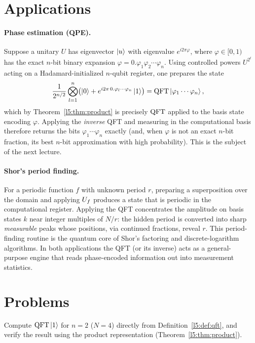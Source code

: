 \section{Applications}

\paragraph{Phase estimation (QPE).}
Suppose a unitary $U$ has eigenvector $\ket{u}$ with eigenvalue
$e^{i 2\pi\varphi}$, where $\varphi\in[0,1)$ has the exact $n$-bit binary
expansion $\varphi = 0.\varphi_1\varphi_2\cdots\varphi_n$. Using controlled
powers $U^{2^{t}}$ acting on a Hadamard-initialized $n$-qubit register, one
prepares the state
\[
  \frac{1}{2^{n/2}}\bigotimes_{l=1}^{n}
    \bigl(\ket{0}+e^{i2\pi\,0.\varphi_l\cdots\varphi_n}\ket{1}\bigr)
  = \mathrm{QFT}\ket{\varphi_1\cdots\varphi_n},
\]
which by Theorem~\ref{l5:thm:product} is precisely $\mathrm{QFT}$ applied to the basis
state encoding $\varphi$. Applying the \emph{inverse} QFT and measuring in the
computational basis therefore returns the bits $\varphi_1\cdots\varphi_n$
exactly (and, when $\varphi$ is not an exact $n$-bit fraction, its best $n$-bit
approximation with high probability). This is the subject of the next lecture.

\paragraph{Shor's period finding.}
For a periodic function $f$ with unknown period $r$, preparing a superposition
over the domain and applying $U_f$ produces a state that is periodic in the
computational register. Applying the QFT concentrates the amplitude on basis
states $k$ near integer multiples of $N/r$: the hidden period is converted into
sharp \emph{measurable} peaks whose positions, via continued fractions, reveal
$r$. This period-finding routine is the quantum core of Shor's factoring and
discrete-logarithm algorithms. In both applications the QFT (or its inverse)
acts as a general-purpose engine that reads phase-encoded information out into
measurement statistics.

\section{Problems}

\begin{exercise}\label{l5:ex:p1}
Compute $\mathrm{QFT}\ket{1}$ for $n=2$ ($N=4$) directly from Definition~\ref{l5:def:qft},
and verify the result using the product representation
(Theorem~\ref{l5:thm:product}).
\end{exercise}

